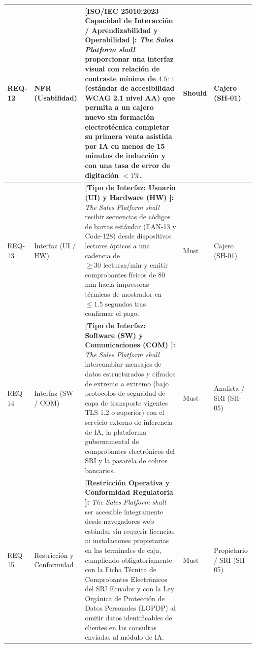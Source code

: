 \begin{table}[htbp]
\begin{tabularx}{\textwidth}{l >{\raggedright\arraybackslash}p{} Y l >{\raggedright\arraybackslash}p{0.08\textwidth}}
		\midrule
		REQ-12 & NFR (Usabilidad) & \textbf{[ISO/IEC 25010:2023 -- Capacidad de Interacción / Aprendizabilidad y Operabilidad \cite{iso25010}]:} \textit{The Sales Platform shall} proporcionar una interfaz visual con relación de contraste mínima de $4.5:1$ (estándar de accesibilidad WCAG 2.1 nivel AA) que permita a un cajero nuevo sin formación electrotécnica completar su primera venta asistida por IA en menos de 15 minutos de inducción y con una tasa de error de digitación $< 1\%$. & Should & Cajero (SH-01) \\
		\midrule
		REQ-13 & Interfaz (UI / HW) & \textbf{[Tipo de Interfaz: Usuario (UI) y Hardware (HW) \cite{ieee29148}]:} \textit{The Sales Platform shall} recibir secuencias de códigos de barras estándar (EAN-13 y Code-128) desde dispositivos lectores ópticos a una cadencia de $\ge 30\text{ lecturas/min}$ y emitir comprobantes físicos de 80 mm hacia impresoras térmicas de mostrador en $\le 1.5\text{ segundos}$ tras confirmar el pago. & Must & Cajero (SH-01) \\
		\midrule
		REQ-14 & Interfaz (SW / COM) & \textbf{[Tipo de Interfaz: Software (SW) y Comunicaciones (COM) \cite{ieee29148}]:} \textit{The Sales Platform shall} intercambiar mensajes de datos estructurados y cifrados de extremo a extremo (bajo protocolos de seguridad de capa de transporte vigentes TLS 1.2 o superior) con el servicio externo de inferencia de IA, la plataforma gubernamental de comprobantes electrónicos del SRI y la pasarela de cobros bancarios. & Must & Analista / SRI (SH-05) \\
		\midrule
		REQ-15 & Restricción y Conformidad & \textbf{[Restricción Operativa y Conformidad Regulatoria \cite{ieee29148, pohl2025}]:} \textit{The Sales Platform shall} ser accesible íntegramente desde navegadores web estándar sin requerir licencias ni instalaciones propietarias en las terminales de caja, cumpliendo obligatoriamente con la Ficha Técnica de Comprobantes Electrónicos del SRI Ecuador y con la Ley Orgánica de Protección de Datos Personales (LOPDP) al omitir datos identificables de clientes en las consultas enviadas al módulo de IA. & Must & Propietario / SRI (SH-05) \\
		\bottomrule
	\end{tabularx}
\end{table}
